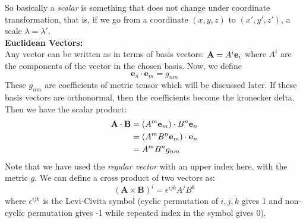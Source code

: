 \noindent
So basically a \textit{scalar} is something that does not change under coordinate transformation, that is, if we go from a coordinate $(x,y,z)$ to $(x',y',z')$, a scale $\lambda = \lambda'$.\\[0.3cm]
\textbf{Euclidean Vectors:}\\[0.3cm]
Any vector can be written as in terms of basis vectors: $\mathbf{A} = \tensor{A}{^i}\mathbf{e}_i$ where $A^i$ are the components of the vector in the chosen basis. Now, we define $$\mathbf{e}_n\cdot \mathbf{e}_m = g_{nm}$$
These $g_{nm}$ are coefficients of metric tensor which will be discussed later. If these basis vectors are orthonormal, then the coefficients become the kronecker delta. Then we have the scalar product:
\begin{align*}
    \mathbf{A}\cdot \mathbf{B} &=  (\tensor{A}{^m}\mathbf{e}_m)\cdot  \tensor{B}{^n}\mathbf{e}_n\\
    &=(\tensor{A}{^m}\tensor{B}{^n}\mathbf{e}_m)\cdot  \mathbf{e}_n\\
    &=\tensor{A}{^m}\tensor{B}{^n}g_{nm}
\end{align*}
Note that we have used the \textit{regular vector} with an upper index here, with the metric $g$. We can define a cross product of two vectors as:
$$(\mathbf{A}\times \mathbf{B})^i = \epsilon^{ijk}A^jB^k$$
where $\epsilon^{ijk}$ is the Levi-Civita symbol (cyclic permutation of ${i,j,k}$ gives 1 and non-cyclic permutation gives -1 while repeated index in the symbol gives 0). \\[0.3cm]
